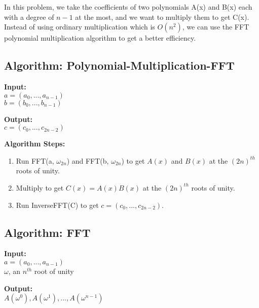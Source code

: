\documentclass[11pt]{article}
\begin{document}
\textsf{In this problem, we take the coefficients of two polynomials A(x) and B(x) each with a degree of $n-1$ at the most, and we want to multiply them to get C(x). Instead of using ordinary multiplication which is $O(n^2)$, we can use the FFT polynomial multiplication algorithm to get a better efficiency.}

\subsection{Algorithm: Polynomial-Multiplication-FFT}
\noindent
\textbf{Input:} \\
$a = (a_0, ..., a_{n-1})$ \\
$b = (b_0, ..., b_{n-1})$

\vspace{10pt}

\noindent
\textbf{Output:} \\
$c = (c_0, ..., c_{2n-2})$

\vspace{10pt}

\noindent
\textbf{Algorithm Steps:}
\begin{enumerate}
    \item Run FFT(a, $\omega_{2n}$) and FFT(b, $\omega_{2n}$) to get $A(x)$ and $B(x)$ at the $(2n)^{th}$ roots of unity.
    \item Multiply to get $C(x) = A(x)B(x)$ at the $(2n)^{th}$ roots of unity.
    \item Run InverseFFT(C) to get $c = (c_0, ..., c_{2n-2})$.
\end{enumerate}

\vspace{10pt}

\subsection{Algorithm: FFT}
\noindent
\textbf{Input:} \\
$a = (a_0, ..., a_{n-1})$ \\
$\omega$, an $n^{th}$  root of unity

\vspace{10pt}

\noindent
\textbf{Output:} \\
$A(\omega^0),A(\omega^1),...,A(\omega^{n-1})$

\vspace{10pt}
\end{document}
